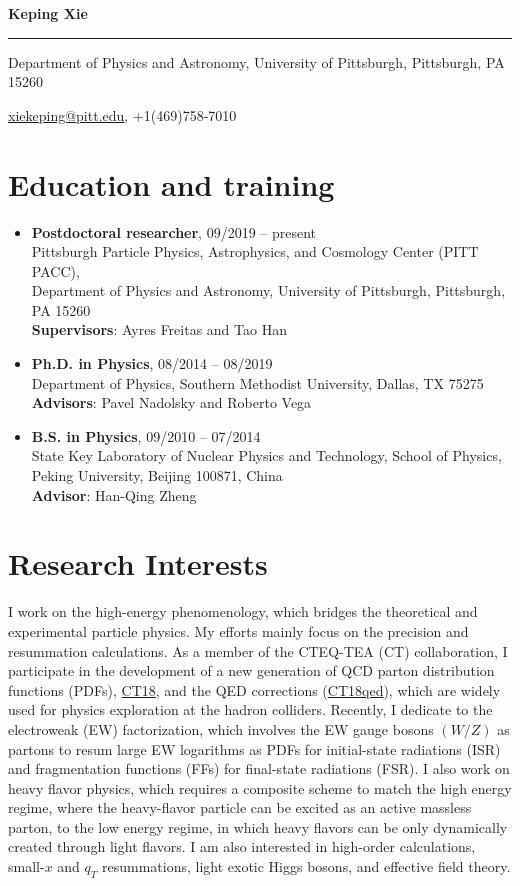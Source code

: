 \documentclass[12pt]{article}
\newcommand{\email}[1]{\href{mailto:#1}{#1}}
\begin{document}
\centerline{\Huge\bf Keping Xie} %
\noindent\rule{\textwidth}{1pt}
\centerline{
Department of Physics and Astronomy, 
University of Pittsburgh, Pittsburgh, PA 15260}
\centerline{\email{xiekeping@pitt.edu}, +1(469)758-7010}

\section*{Education and training} 
\begin{itemize}
\item
\textbf{Postdoctoral researcher}, 09/2019 -- present\\
Pittsburgh Particle Physics, Astrophysics, and Cosmology Center (PITT PACC),\\
Department of Physics and Astronomy, 
University of Pittsburgh, Pittsburgh, PA 15260\\
\textbf{Supervisors}: Ayres Freitas and Tao Han
\item
\textbf{Ph.D. in Physics}, 08/2014 -- 08/2019 \\
Department of Physics, Southern Methodist University, Dallas, TX 75275 \\
\textbf{Advisors}: Pavel Nadolsky and Roberto Vega
\item
\textbf{B.S. in Physics}, 09/2010 -- 07/2014\\
State Key Laboratory of Nuclear Physics and Technology, School of Physics,\\
Peking University, Beijing 100871, China\\
\textbf{Advisor}: Han-Qing Zheng%
\end{itemize}

\section*{Research Interests}
I work on the high-energy phenomenology, which bridges the theoretical and experimental particle physics. My efforts mainly focus on the precision and resummation calculations. As a member of the CTEQ-TEA (CT) collaboration, I participate in the development of a new generation of QCD parton distribution functions (PDFs), \href{https://ct.hepforge.org}{CT18}, and the QED corrections (\href{https://ct.hepforge.org}{CT18qed}), which are widely used for physics exploration at the hadron colliders. Recently, I dedicate to the electroweak (EW) factorization, which involves the EW gauge bosons $(W/Z)$ as partons to resum large EW logarithms as PDFs for initial-state radiations (ISR) and fragmentation functions (FFs) for final-state radiations (FSR). I also work on heavy flavor physics, which requires a composite scheme to match the high energy regime, where the heavy-flavor particle can be excited as an active massless parton, to the low energy regime, in which heavy flavors can be only dynamically created through light flavors. I am also interested in high-order calculations, small-$x$ and $q_T$ resummations, light exotic Higgs bosons, and effective field theory.
\end{document}
